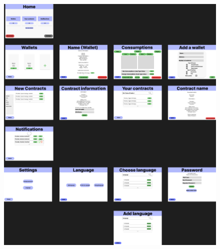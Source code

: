 \newpage
\begin{figure}[h]
\centering
\includegraphics[width=1\textwidth]{extension-adrien/Interface/img/interface.png}
\end{figure}
